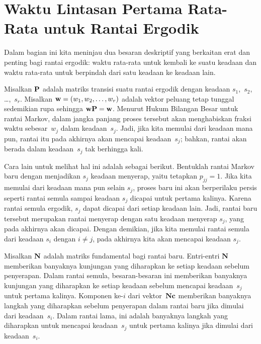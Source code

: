 \section[Waktu Lintasan Pertama Rata-Rata]{Waktu Lintasan Pertama Rata-Rata
untuk Rantai Ergodik}\label{sec 11.5}
Dalam bagian ini kita meninjau dua besaran deskriptif yang berkaitan erat dan
penting bagi rantai ergodik: waktu rata-rata untuk kembali ke suatu keadaan dan
waktu rata-rata untuk berpindah dari satu keadaan ke keadaan lain.
\par
Misalkan ${\mbox{\bf P}\/}$ adalah matriks transisi suatu rantai ergodik dengan keadaan
$s_1$,~$s_2$, \ldots,~$s_r$. Misalkan ${\mbox{\bf w}\/} = (w_1,w_2,\ldots,w_r)$ adalah
vektor peluang tetap tunggal sedemikian rupa sehingga
${\mbox{\bf w}\/} {\mbox{\bf P}\/} = {\mbox{\bf w}\/}$.
Menurut Hukum Bilangan Besar untuk rantai Markov, dalam jangka panjang proses
tersebut akan menghabiskan fraksi waktu sebesar~$w_j$ dalam keadaan~$s_j$. Jadi,
jika kita memulai dari keadaan mana pun, rantai itu pada akhirnya akan mencapai
keadaan~$s_j$; bahkan, rantai akan berada dalam keadaan~$s_j$ tak berhingga kali.
\par
Cara lain untuk melihat hal ini adalah sebagai berikut. Bentuklah rantai Markov
baru dengan menjadikan $s_j$ keadaan menyerap, yaitu tetapkan $p_{jj} = 1$. Jika
kita memulai dari keadaan mana pun selain $s_j$, proses baru ini akan berperilaku
persis seperti rantai semula sampai keadaan $s_j$ dicapai untuk pertama kalinya.
Karena rantai semula ergodik, $s_j$ dapat dicapai dari setiap keadaan lain. Jadi,
rantai baru tersebut merupakan rantai menyerap dengan satu keadaan menyerap
$s_j$, yang pada akhirnya akan dicapai. Dengan demikian, jika kita memulai rantai
semula dari keadaan $s_i$ dengan $i \ne j$, pada akhirnya kita akan mencapai
keadaan $s_j$.
\par
Misalkan ${\mbox{\bf N}\/}$ adalah matriks fundamental bagi rantai baru. Entri-entri
${\mbox{\bf N}\/}$ memberikan banyaknya kunjungan yang diharapkan ke setiap keadaan
sebelum penyerapan. Dalam rantai semula, besaran-besaran ini memberikan banyaknya
kunjungan yang diharapkan ke setiap keadaan sebelum mencapai keadaan~$s_j$ untuk
pertama kalinya. Komponen ke-$i$ dari vektor~${\mbox{\bf N}\/} {\mbox{\bf c}\/}$ memberikan
banyaknya langkah yang diharapkan sebelum penyerapan dalam rantai baru jika
dimulai dari keadaan~$s_i$. Dalam rantai lama, ini adalah banyaknya langkah yang
diharapkan untuk mencapai keadaan~$s_j$ untuk pertama kalinya jika dimulai dari
keadaan~$s_i$.

